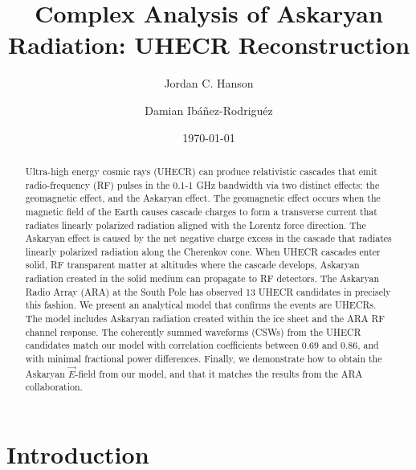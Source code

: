 \documentclass[amsmath,amssymb,aps,prd,10pt,twocolumn,showkeys]{revtex4}
\begin{document}
\title{Complex Analysis of Askaryan Radiation: UHECR Reconstruction}

\author{Jordan C. Hanson}
\author{Damian Ibá\~{n}ez-Rodriguéz}
\date{\today}

\begin{abstract}
Ultra-high energy cosmic rays (UHECR) can produce relativistic cascades that emit radio-frequency (RF) pulses in the 0.1-1 GHz bandwidth via two distinct effects: the geomagnetic effect, and the Askaryan effect.  The geomagnetic effect occurs when the magnetic field of the Earth causes cascade charges to form a transverse current that radiates linearly polarized radiation aligned with the Lorentz force direction.  The Askaryan effect is caused by the net negative charge excess in the cascade that radiates linearly polarized radiation along the Cherenkov cone.  When UHECR cascades enter solid, RF transparent matter at altitudes where the cascade develops, Askaryan radiation created in the solid medium can propagate to RF detectors.  The Askaryan Radio Array (ARA) at the South Pole has observed 13 UHECR candidates in precisely this fashion.  We present an analytical model that confirms the events are UHECRs.  The model includes Askaryan radiation created within the ice sheet and the ARA RF channel response.  The coherently summed waveforms (CSWs) from the UHECR candidates match our model with correlation coefficients between 0.69 and 0.86, and with minimal fractional power differences.  Finally, we demonstrate how to obtain the Askaryan $\vec{E}$-field from our model, and that it matches the results from the ARA collaboration.
\end{abstract}


\maketitle

\section{Introduction}
\label{sec:int}
\end{document}
